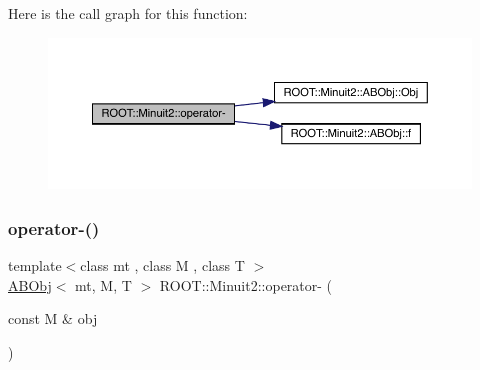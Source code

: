 Here is the call graph for this function\+:\nopagebreak
\begin{figure}[H]
\begin{center}
\leavevmode
\includegraphics[width=350pt]{d6/d3a/namespaceROOT_1_1Minuit2_ad72d0b214406e2325a87fe10b052b9ad_cgraph}
\end{center}
\end{figure}
\mbox{\label{namespaceROOT_1_1Minuit2_a95351951cc1f33b0a2904a47adacd999}} 
\subsubsection{\texorpdfstring{operator-\/()}{operator-()}\hspace{0.1cm}{\footnotesize\ttfamily [4/4]}}
{\footnotesize\ttfamily template$<$class mt , class M , class T $>$ \\
\mbox{\hyperlink{classROOT_1_1Minuit2_1_1ABObj}{A\+B\+Obj}}$<$ mt, M, T $>$ R\+O\+O\+T\+::\+Minuit2\+::operator-\/ (\begin{DoxyParamCaption}\item[{const M \&}]{obj }\end{DoxyParamCaption})\hspace{0.3cm}{\ttfamily [inline]}}

\mbox{\label{namespaceROOT_1_1Minuit2_afaff6ec8d1115025bd92259424674647}} 

